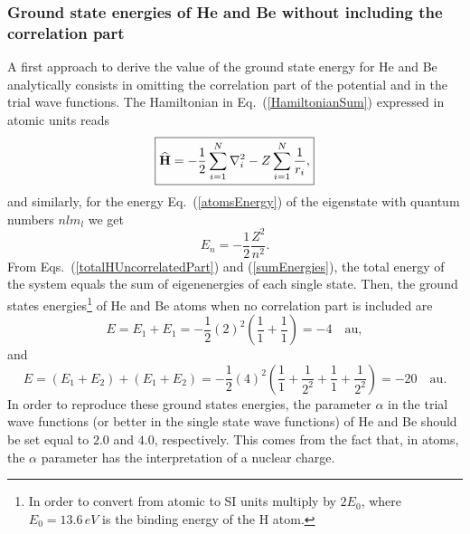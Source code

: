 \subsubsection*{Ground state energies of He and Be without including the correlation part}
A first approach to derive the value of the ground state energy for He and Be analytically consists in omitting the correlation part of the potential and in the trial wave functions. The Hamiltonian in Eq.~(\ref{HamiltonianSum}) expressed in atomic units reads
\begin{equation}\label{uncorrelatedAtomsHamiltonian}
\boxed{{\bf\widehat{H}} = -\frac{1}{2}\sum_{i=1}^{N}\nabla^{2}_{i}
  - Z \sum_{i=1}^{N} \frac{1}{r_i},}
\end{equation}
and similarly, for the energy Eq.~(\ref{atomsEnergy}) of the eigenstate with quantum numbers $nlm_l$ we get
\begin{equation}\label{atomsEnergyAU}
 \boxed{E_n = -\frac{1}{2}\frac{Z^2}{n^2}.}
\end{equation}
From Eqs.~(\ref{totalHUncorrelatedPart}) and (\ref{sumEnergies}), the total energy of the system equals the sum of eigenenergies of each single state. Then, the ground states energies\footnote{In order to convert from atomic to SI units multiply by $2E_0$, where $E_0=13.6 \, eV$ is the binding energy of the H atom.} of He and Be atoms when no correlation part is included are \begin{equation}
\boxed{E = E_{1} + E_{1} = -\frac{1}{2}(2)^2 \left(\frac{1}{1} +  \frac{1}{1}\right) = - 4 \quad \text{au},}
\end{equation}
and 
\begin{equation}
 \boxed{E = (E_1 + E_2) + (E_1 + E_2) = -\frac{1}{2}(4)^2 \left(\frac{1}{1} +  \frac{1}{2^2} + \frac{1}{1} +  \frac{1}{2^2}\right) = - 20 \quad \text{au}.}
\end{equation}
In order to reproduce these ground states energies, the parameter $\alpha$ in the trial wave functions (or better in the single state wave functions) of He and Be should be set equal to $2.0$ and $4.0$, respectively. This comes from the fact that, in atoms, the $\alpha$ parameter has the interpretation of a nuclear charge.

